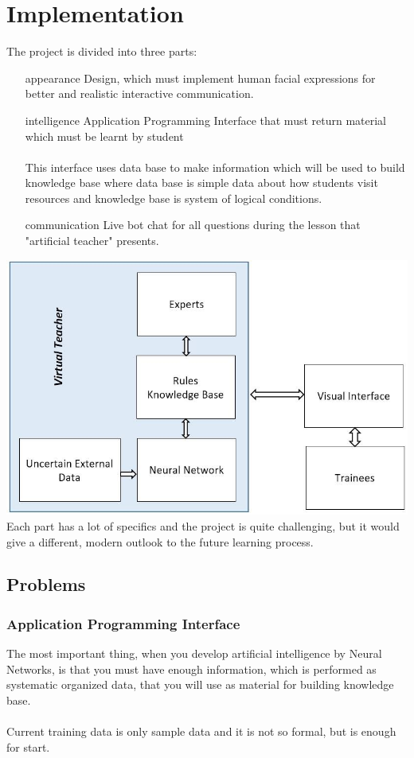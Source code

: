 \documentclass[a4paper, 12pt]{article}
\begin{document}
	\section{Implementation}
		The project is divided into three parts:
		\begin{itemize}
			\item[appearance] Design, which must implement human facial expressions for better and realistic interactive communication. 
			\item[intelligence] Application Programming Interface that must return material which must be learnt by student \\ \\ This interface uses data base to make information which will be used to build knowledge base where data base is simple data about how students visit resources and knowledge base is system of logical conditions.
			\item[communication] Live bot chat for all questions during the lesson that "artificial teacher" presents. 
		\end{itemize}
		{\centering
			\includegraphics[width=\textwidth]{../schema.jpg}
		}
		Each part has a lot of specifics and the project is quite challenging, but it would give a different, modern outlook to the future learning process.
		\subsection{Problems}
			\subsubsection{Application Programming Interface}
				The most important thing, when you develop artificial intelligence by Neural Networks, is that you must have enough information, which is performed as systematic organized data, that you will use as material for building knowledge base. \\ \\
				Current training data is only sample data and it is not so formal, but is enough for start.
\end{document}

